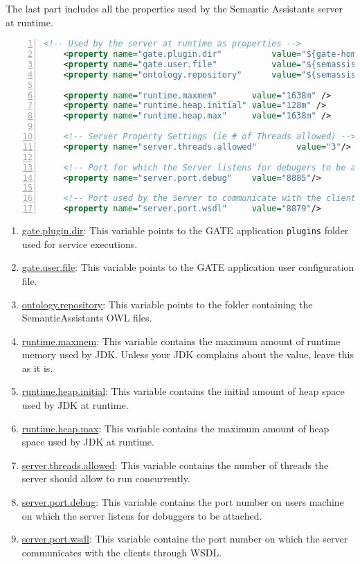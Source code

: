 The last part includes all the properties used by the Semantic Assistants server at runtime.
\begin{lstlisting}[language=XML,numbers=left,xleftmargin=8mm,columns=flexible]
    <!-- Used by the server at runtime as properties -->
    <property name="gate.plugin.dir"          value="${gate-home}/plugins/"/>
    <property name="gate.user.file"           value="${semassist.home}/Server/gate-home/user-gate.xml" />
    <property name="ontology.repository"      value="${semassist.home}/Resources/ont-repository/" />

    <property name="runtime.maxmem"       value="1638m" />
    <property name="runtime.heap.initial" value="128m" />
    <property name="runtime.heap.max"     value="1638m" />
    
    <!-- Server Property Settings (ie # of Threads allowed) -->
    <property name="server.threads.allowed"        value="3"/>

    <!-- Port for which the Server listens for debugers to be attached -->
    <property name="server.port.debug"    value="8885"/>
    
    <!-- Port used by the Server to communicate with the clients through wsdl-->
    <property name="server.port.wsdl"     value="8879"/>
\end{lstlisting}
\begin{enumerate}
\item \url{gate.plugin.dir}: This variable points to the GATE application \texttt{plugins} folder used for service executions.
\item \url{gate.user.file}: This variable points to the GATE application user configuration file.
\item \url{ontology.repository}: This variable points to the folder containing the SemanticAssistants OWL files.
\item \url{runtime.maxmem}: This variable contains the maximum amount of runtime memory used by JDK. Unless your JDK complains about the value, leave this as it is.
\item \url{runtime.heap.initial}: This variable contains the initial amount of heap space used by JDK at runtime.
\item \url{runtime.heap.max}: This variable contains the maximum amount of heap space used by JDK at runtime.
\item \url{server.threads.allowed}: This variable contains the number of threads the server should allow to run concurrently.
\item \url{server.port.debug}: This variable contains the port number on users machine on which the server listens for debuggers to be attached.
\item \url{server.port.wsdl}: This variable contains the port number on which the server communicates with the clients through WSDL.
\end{enumerate}


